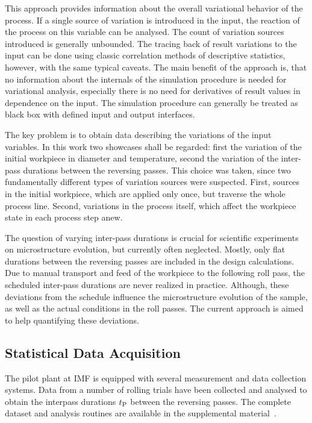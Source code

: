 This approach provides information about the overall variational behavior of the process.
If a single source of variation is introduced in the input, the reaction of the process on this variable can be analysed.
The count of variation sources introduced is generally unbounded.
The tracing back of result variations to the input can be done using classic correlation methods of descriptive statistics, however, with the same typical caveats.
The main benefit of the approach is, that no information about the internals of the simulation procedure is needed for variational analysis, especially there is no need for derivatives of result values in dependence on the input.
The simulation procedure can generally be treated as black box with defined input and output interfaces.

The key problem is to obtain data describing the variations of the input variables.
In this work two showcases shall be regarded: first the variation of the initial workpiece in diameter and temperature,
second the variation of the inter-pass durations between the reversing passes.
This choice was taken, since two fundamentally different types of variation sources were suspected.
First, sources in the initial workpiece, which are applied only once, but traverse the whole process line.
Second, variations in the process itself, which affect the workpiece state in each process step anew.

The question of varying inter-pass durations is crucial for scientific experiments on microstructure evolution, but currently often neglected.
Mostly, only flat durations between the reversing passes are included in the design calculations.
Due to manual transport and feed of the workpiece to the following roll pass, the scheduled inter-pass durations are never realized in practice.
Although, these deviations from the schedule influence the microstructure evolution of the sample, as well as the actual conditions in the roll passes.
The current approach is aimed to help quantifying these deviations.

\subsection{Statistical Data Acquisition}\label{subsec:data-acquisition}

The pilot plant at IMF is equipped with several measurement and data collection systems.
Data from a number of rolling trials have been collected and analysed to obtain the interpass durations ${t_\mathrm{P}}$ between the reversing passes.
The complete dataset and analysis routines are available in the supplemental material~\cite{esaform2023_weiner_supp}.

